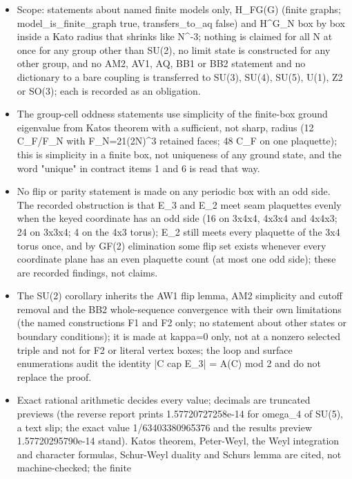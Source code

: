 \begin{gatequote}
\begin{itemize}
\item Scope: statements about named finite models only, H\_FG(G) (finite
graphs; model\_is\_finite\_graph true, transfers\_to\_aq false) and
H\textasciicircum{}G\_N box by box inside a Kato radius that shrinks like
N\textasciicircum{}-3; nothing is claimed for all N at once for any group
other than SU(2), no limit state is constructed for any other group, and no
AM2, AV1, AQ, BB1 or BB2 statement and no dictionary to a bare coupling is
transferred to SU(3), SU(4), SU(5), U(1), Z2 or SO(3); each is recorded as an
obligation.
\item The group-cell oddness statements use simplicity of the finite-box
ground eigenvalue from Kato\textquotesingle{}s theorem with a sufficient, not
sharp, radius (12 C\_F/F\_N with F\_N=21(2N)\textasciicircum{}3 retained
faces; 48 C\_F on one plaquette); this is simplicity in a finite box, not
uniqueness of any ground state, and the word "unique" in contract items 1 and
6 is read that way.
\item No flip or parity statement is made on any periodic box with an odd
side. The recorded obstruction is that E\_3 and E\_2 meet seam plaquettes
evenly when the keyed coordinate has an odd side (16 on 3x4x4, 4x3x4 and
4x4x3; 24 on 3x3x4; 4 on the 4x3 torus); E\_2 still meets every plaquette of
the 3x4 torus once, and by GF(2) elimination some flip set exists whenever
every coordinate plane has an even plaquette count (at most one odd side);
these are recorded findings, not claims.
\item The SU(2) corollary inherits the AW1 flip lemma, AM2 simplicity and
cutoff removal and the BB2 whole-sequence convergence with their own
limitations (the named constructions F1 and F2 only; no statement about other
states or boundary conditions); it is made at kappa=0 only, not at a nonzero
selected triple and not for F2 or literal vertex boxes; the loop and surface
enumerations audit the identity |C cap E\_3| = A(C) mod 2 and do not replace
the proof.
\item Exact rational arithmetic decides every value; decimals are truncated
previews (the reverse report prints 1.57720727258e-14 for omega\_4 of SU(5), a
text slip; the exact value 1/63403380965376 and the results preview
1.57720295790e-14 stand). Kato\textquotesingle{}s theorem, Peter-Weyl, the
Weyl integration and character formulas, Schur-Weyl duality and
Schur\textquotesingle{}s lemma are cited, not machine-checked; the finite

\end{itemize}
\end{gatequote}
